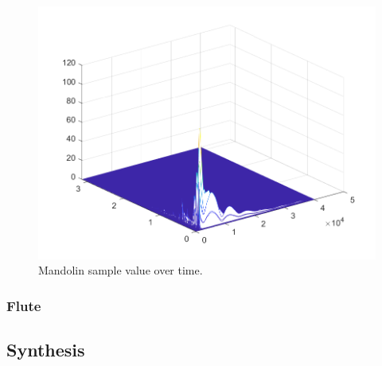 \documentclass{article}
\begin{document}
            \begin{figure}[h]
                \includegraphics[scale=0.5]{images/specWaterfallMando1.png}%
                \centering
                \caption{Mandolin sample value over time.}
                \label{specWaterfallMando1}
            \end{figure}
            
        \subsubsection{Flute}

    \subsection{Synthesis}
\end{document}
